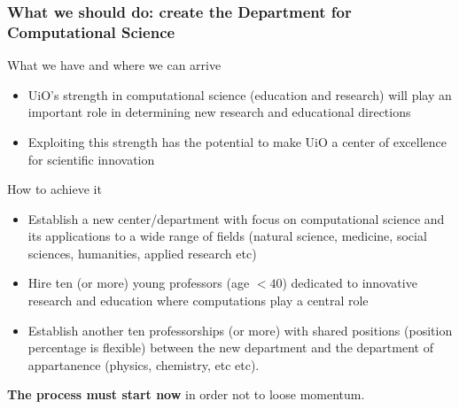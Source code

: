 \documentclass{beamer}
\begin{document}
\begin{frame}
\frametitle{What we should do: create the Department  for Computational Science}

\begin{block}{What we have and where we can arrive }
\begin{itemize}
\item UiO's strength in computational science (education and research) will play an important role in  determining new research and educational directions

\item Exploiting this strength has the potential to make UiO a center of excellence for scientific innovation
\end{itemize}

\noindent
\end{block}

\begin{block}{How to achieve it }
\begin{itemize}
\item Establish  a new center/department with focus on computational science and its applications to a wide range of fields (natural science, medicine, social sciences, humanities, applied research etc)

\item Hire ten (or more) young professors (age $< 40$) dedicated to innovative research and education where computations play a central role

\item Establish another ten professorships (or more) with  shared positions (position percentage  is flexible) between the  new department and the department of appartanence (physics, chemistry, etc etc).
\end{itemize}

\noindent
\end{block}

\textbf{The process must start now} in order not to loose momentum.
\end{frame}
\end{document}
